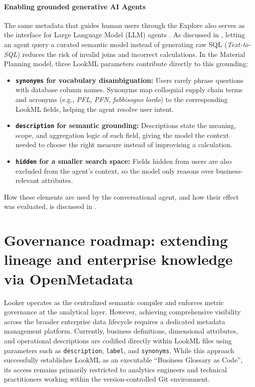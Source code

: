 \paragraph{Enabling grounded generative AI Agents}
The same metadata that guides human users through the Explore also serves as the interface for Large Language Model (LLM) agents \cite{googlecloudlookerca2024}. As discussed in , letting an agent query a curated semantic model instead of generating raw SQL (\textit{Text-to-SQL}) reduces the risk of invalid joins and incorrect calculations. In the Material Planning model, three LookML parameters contribute directly to this grounding:
\begin{itemize}
    \item \textbf{\texttt{synonyms} for vocabulary disambiguation:} Users rarely phrase questions with database column names. Synonyms map colloquial supply chain terms and acronyms (e.g., \textit{PFL}, \textit{PFN}, \textit{fabbisogno lordo}) to the corresponding LookML fields, helping the agent resolve user intent.
    \item \textbf{\texttt{description} for semantic grounding:} Descriptions state the meaning, scope, and aggregation logic of each field, giving the model the context needed to choose the right measure instead of improvising a calculation.
    \item \textbf{\texttt{hidden} for a smaller search space:} Fields hidden from users are also excluded from the agent's context, so the model only reasons over business-relevant attributes.
\end{itemize}

How these elements are used by the conversational agent, and how their effect was evaluated, is discussed in .


\section[Metadata Architecture Roadmap]{Governance roadmap: extending lineage and enterprise knowledge via OpenMetadata}
\label{sec:openmetadata_roadmap}

Looker operates as the centralized semantic compiler and enforces metric governance at the analytical layer. However, achieving comprehensive visibility across the broader enterprise data lifecycle requires a dedicated metadata management platform. Currently, business definitions, dimensional attributes, and operational descriptions are codified directly within LookML files using parameters such as \texttt{description}, \texttt{label}, and \texttt{synonyms}. While this approach successfully establishes LookML as an executable ``Business Glossary as Code'', its access remains primarily restricted to analytics engineers and technical practitioners working within the version-controlled Git environment.

